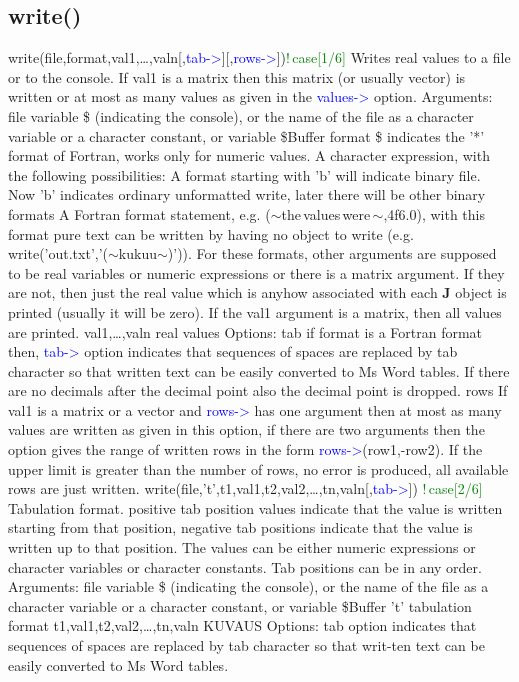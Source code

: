 \subsection{\textcolor{VioletRed}{write}()}
\label{write}
\textcolor{VioletRed}{write}(file,format,val1,…,valn[,\textcolor{blue}{tab->}][,\textcolor{blue}{rows->}])\textcolor{green}{!\,case[1/6]}
Writes real values to a file or to the console. If val1 is a matrix then this matrix (or usually
vector) is written or at most as many values as given in the \textcolor{blue}{values->} option.
Arguments:
file variable \$ (indicating the console), or the name of the file as a character variable
or a character constant, or variable \$Buffer
format
\$ indicates the '*' format of Fortran, works only for numeric values.
A character expression, with the following possibilities:
A format starting with 'b' will indicate binary file. Now 'b' indicates ordinary
unformatted write, later there will be other binary formats
A Fortran format statement, e.g. ($\sim$the\,values\,were\,$\sim$,4f6.0), with this
format pure text can be written by having no object to write (e.g.
\textcolor{VioletRed}{write}('out.txt','($\sim$kukuu$\sim$)')).
For these formats, other arguments are supposed to be real variables or numeric
expressions or there is a matrix argument. If they are not, then just the real value
which is anyhow associated with each \textbf{J} object is printed (usually it will be zero).
If the val1 argument is a matrix, then all values are printed.
val1,…,valn
real values
Options:
tab if format is a Fortran format then, \textcolor{blue}{tab->} option indicates that sequences of
spaces are replaced by tab character so that written text can be easily converted
to Ms Word tables. If there are no decimals after the decimal point also the
decimal point is dropped.
rows If val1 is a matrix or a vector and \textcolor{blue}{rows->} has one argument then at most as
many values are written as given in this option, if there are two arguments then
the option gives the range of written rows in the form \textcolor{blue}{rows->}(row1,-row2). If the
upper limit is greater than the number of rows, no error is produced, all available
rows are just written.
\textcolor{VioletRed}{write}(file,'t',t1,val1,t2,val2,…,tn,valn[,\textcolor{blue}{tab->}]) \textcolor{green}{!\,case[2/6]}
Tabulation format. positive tab position values indicate that the value is written starting from
that position, negative tab positions indicate that the value is written up to that position. The
values can be either numeric expressions or character variables or character constants. Tab
positions can be in any order.
Arguments:
file variable \$ (indicating the console), or the name of the file as a character variable
or a character constant, or variable \$Buffer
't' tabulation format
t1,val1,t2,val2,…,tn,valn
KUVAUS
Options:
tab option indicates that sequences of spaces are replaced by tab character so that
writ-ten text can be easily converted to Ms Word tables.

